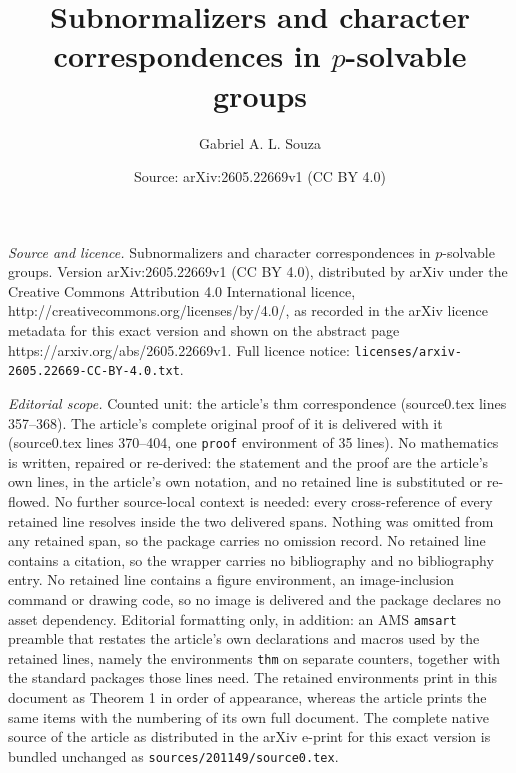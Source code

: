 \documentclass[10pt,a4paper]{amsart}
\title{Subnormalizers and character correspondences in $p$-solvable groups}
\author{Gabriel A. L. Souza}
\date{Source: arXiv:2605.22669v1 (CC BY 4.0)}
\begin{document}
\maketitle

\noindent\emph{Source and licence.} Subnormalizers and character correspondences in $p$-solvable groups. Version arXiv:2605.22669v1 (CC BY 4.0), distributed by arXiv under the Creative Commons Attribution 4.0 International licence, http://creativecommons.org/licenses/by/4.0/, as recorded in the arXiv licence metadata for this exact version and shown on the abstract page https://arxiv.org/abs/2605.22669v1. Full licence notice: \texttt{licenses/arxiv-2605.22669-CC-BY-4.0.txt}.\par\smallskip

\noindent\textit{Editorial scope.} Counted unit: the article's thm correspondence (source0.tex lines 357--368). The article's complete original proof of it is delivered with it (source0.tex lines 370--404, one \texttt{proof} environment of 35 lines). No mathematics is written, repaired or re-derived: the statement and the proof are the article's own lines, in the article's own notation, and no retained line is substituted or re-flowed.  No further source-local context is needed: every cross-reference of every retained line resolves inside the two delivered spans.  Nothing was omitted from any retained span, so the package carries no omission record.  No retained line contains a citation, so the wrapper carries no bibliography and no bibliography entry.  No retained line contains a figure environment, an image-inclusion command or drawing code, so no image is delivered and the package declares no asset dependency.  Editorial formatting only, in addition: an AMS \texttt{amsart} preamble that restates the article's own declarations and macros used by the retained lines, namely the environments \texttt{thm} on separate counters, together with the standard packages those lines need.  The retained environments print in this document as Theorem 1 in order of appearance, whereas the article prints the same items with the numbering of its own full document.  The complete native source of the article as distributed in the arXiv e-print for this exact version is bundled unchanged as \texttt{sources/201149/source0.tex}.
\end{document}

